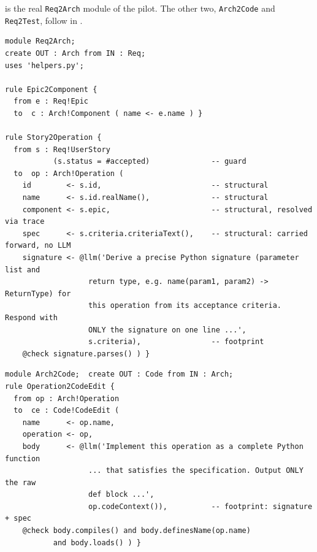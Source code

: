 \documentclass[10pt,a4paper]{article}
\newcommand{\code}[1]{\texttt{#1}}
\newcommand{\file}[1]{\texttt{#1}}
\theoremstyle{definition}
\begin{document}
 is the real \code{Req2Arch} module of the pilot. The
other two, \code{Arch2Code} and \code{Req2Test}, follow in
.

\begin{lstlisting}[language=ATL, style=model, caption={\file{devbench_rules/Req2Arch.agentm2m} ($T_1$).}, label={lst:req2arch}]
module Req2Arch;
create OUT : Arch from IN : Req;
uses 'helpers.py';

rule Epic2Component {
  from e : Req!Epic
  to  c : Arch!Component ( name <- e.name ) }

rule Story2Operation {
  from s : Req!UserStory
           (s.status = #accepted)              -- guard
  to  op : Arch!Operation (
    id        <- s.id,                         -- structural
    name      <- s.id.realName(),              -- structural
    component <- s.epic,                       -- structural, resolved via trace
    spec      <- s.criteria.criteriaText(),    -- structural: carried forward, no LLM
    signature <- @llm('Derive a precise Python signature (parameter list and
                   return type, e.g. name(param1, param2) -> ReturnType) for
                   this operation from its acceptance criteria. Respond with
                   ONLY the signature on one line ...',
                   s.criteria),                -- footprint
    @check signature.parses() ) }
\end{lstlisting}

\begin{lstlisting}[language=ATL, style=model, caption={\file{devbench_rules/Arch2Code.agentm2m}.}, label={lst:arch2code}]
module Arch2Code;  create OUT : Code from IN : Arch;
rule Operation2CodeEdit {
  from op : Arch!Operation
  to  ce : Code!CodeEdit (
    name      <- op.name,
    operation <- op,
    body      <- @llm('Implement this operation as a complete Python function
                   ... that satisfies the specification. Output ONLY the raw
                   def block ...',
                   op.codeContext()),          -- footprint: signature + spec
    @check body.compiles() and body.definesName(op.name)
           and body.loads() ) }
\end{lstlisting}
\end{document}
